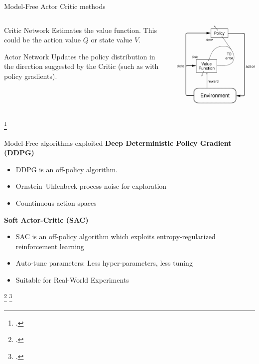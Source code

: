 \documentclass[aspectratio=169,handout]{beamer}
\begin{document}
\begin{frame}{Model-Free Actor Critic methods}
	\begin{columns}
		\begin{column}{0.5\linewidth}
			\begin{exampleblock}{Critic Network}
				Estimates the value function. This could be the action value $Q$ or state value $V$.
			\end{exampleblock}
			\begin{exampleblock}{Actor Network}
				Updates the policy distribution in the direction suggested by the Critic (such as with policy gradients).
			\end{exampleblock}
		\end{column}
	\begin{column}{0.5\linewidth}
		\centering
		\includegraphics[width=0.8\linewidth]{img/actor_critic.png}
	\end{column}
	\end{columns}
		\footcite*{sutton2018reinforcement}

\end{frame}

\begin{frame}{Model-Free algorithms exploited}
	\centering
	\textbf{Deep Deterministic Policy Gradient (DDPG)}
	\begin{itemize}
		\item DDPG is an off-policy algorithm.
		\item Ornstein–Uhlenbeck process noise for exploration
		\item Countinuous action spaces
	\end{itemize}
	\textbf{Soft Actor-Critic (SAC)}
	\begin{itemize}
		\item SAC is an off-policy algorithm which exploits entropy-regularized reinforcement learning
		\item Auto-tune parameters: Less hyper-parameters, less tuning
		\item Suitable for Real-World Experiments
	\end{itemize}
	\footcite*{lillicrap2015continuous}
	\footcite*{haarnoja2018alg}
\end{frame}
\end{document}
